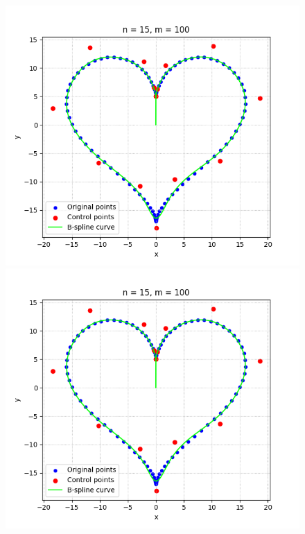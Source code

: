 \documentclass[11pt]{article}
\begin{document}
\begin{figure}[H]
    \centering
    \includegraphics[scale=0.5]{../../Devoir1/rapport/images/coeur1.png}
    \includegraphics[scale=0.5]{../../Devoir1/rapport/images/coeur1.png}

\end{figure}
\end{document}
